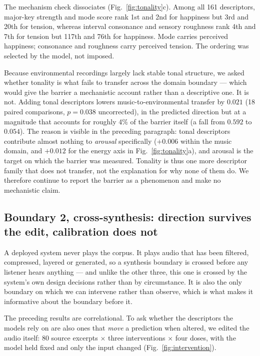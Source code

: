 The mechanism check dissociates (Fig.~\ref{fig:tonality}c). Among all 161
descriptors, major-key strength and mode score rank 1st and 2nd for happiness but
3rd and 20th for tension, whereas interval consonance and sensory roughness rank
4th and 7th for tension but 117th and 76th for happiness. Mode carries perceived
happiness; consonance and roughness carry perceived tension. The ordering was
selected by the model, not imposed.

Because environmental recordings largely lack stable tonal structure, we asked
whether tonality is what fails to transfer across the domain boundary --- which
would give the barrier a mechanistic account rather than a descriptive one. It is
not. Adding tonal descriptors lowers music-to-environmental transfer by $0.021$
(18 paired comparisons, $p = 0.038$ uncorrected), in the predicted direction but at
a magnitude that accounts for roughly 4\% of the barrier itself (a fall from
$0.592$ to $0.054$). The reason is visible in the preceding paragraph: tonal
descriptors contribute almost nothing to \emph{arousal} specifically ($+0.006$
within the music domain, and $+0.012$ for the energy axis in
Fig.~\ref{fig:tonality}a), and arousal is the target on which the barrier was
measured. Tonality is thus one more descriptor family that does not transfer, not
the explanation for why none of them do. We therefore continue to report the
barrier as a phenomenon and make no mechanistic claim.

\subsection*{Boundary 2, cross-synthesis: direction survives the edit, calibration
does not}

A deployed system never plays the corpus. It plays audio that has been filtered,
compressed, layered or generated, so a synthesis boundary is crossed before any
listener hears anything --- and unlike the other three, this one is crossed by the
system's own design decisions rather than by circumstance. It is also the only
boundary on which we can intervene rather than observe, which is what makes it
informative about the boundary before it.

The preceding results are correlational. To ask whether the descriptors the models
rely on are also ones that \emph{move} a prediction when altered, we edited the
audio itself: 80 source excerpts $\times$ three interventions $\times$ four doses,
with the model held fixed and only the input changed
(Fig.~\ref{fig:intervention}).

